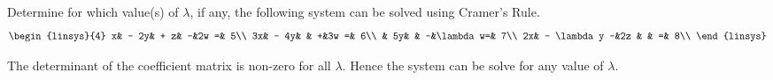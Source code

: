 
\begin{Exercise}[
name={},
title={}, 
difficulty=0,
origin={\cite{YL}}]
Determine for which value(s) of $\lambda$, if any, the following system can be solved
using Cramer's Rule.
\[
\begin{linsys}{4}
x& -  2y& + z& -&2w =& 5\\
3x& - 4y&    & +&3w =& 6\\
  &   5y&    & -&\lambda w=& 7\\
2x& - \lambda y -&2z & & =& 8\\   
\end{linsys}
\]
\end{Exercise}

\begin{Answer}
The determinant of the coefficient matrix is non-zero for all $\lambda$.  Hence the system can be solve for any value of $\lambda$.
\end{Answer}
